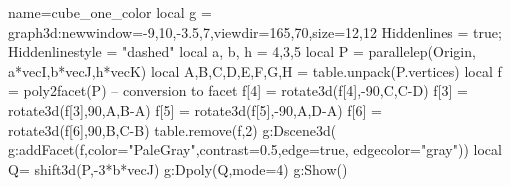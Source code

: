 \begin{luadraw}{name=cube_one_color}
local g = graph3d:new{window={-9,10,-3.5,7},viewdir={165,70},size={12,12}}
Hiddenlines = true; Hiddenlinestyle = "dashed"
local a, b, h = 4,3,5
local P = parallelep(Origin, a*vecI,b*vecJ,h*vecK)
local A,B,C,D,E,F,G,H = table.unpack(P.vertices)
local f = poly2facet(P) -- conversion to facet
f[4] = rotate3d(f[4],-90,{C,C-D}) 
f[3] = rotate3d(f[3],90,{A,B-A})
f[5] = rotate3d(f[5],-90,{A,D-A}) 
f[6] = rotate3d(f[6],90,{B,C-B})  
table.remove(f,2)
g:Dscene3d( g:addFacet(f,{color="PaleGray",contrast=0.5,edge=true, edgecolor="gray"}))
local Q= shift3d(P,-3*b*vecJ)
g:Dpoly(Q,{mode=4})
g:Show()
\end{luadraw}
